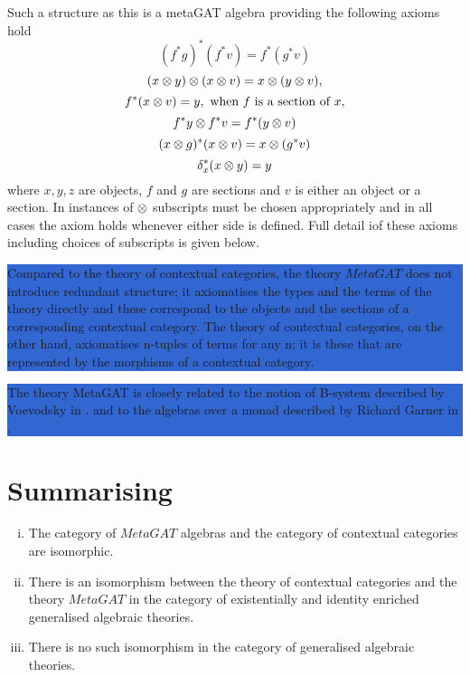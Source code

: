 \documentclass[10pt,a4paper]{article}
\newcommand{\highlightpara}[1]{\colorbox{highlight}{%
    \parbox{\dimexpr\linewidth-2\fboxsep}%
        {#1}}
}
\begin{document}
Such a structure as this is a metaGAT algebra providing the following axioms hold  
\begin{equation}
(f^*g)^*(f^*v) = f^*(g^*v)
\end{equation}
\begin{equation}
(x \otimes y) \otimes (x \otimes v) = x \otimes (y \otimes v), 
\end{equation}
\begin{equation}
f^*(x \otimes v) = y, \mbox{ when $f$ is a section of $x$,} 
\end{equation}
\begin{equation}
f^*y \otimes f^*v = f^*(y \otimes v)
\end{equation}
\begin{equation}
(x \otimes g)^*(x \otimes v)=x \otimes(g^*v)
\end{equation}
\begin{equation}
\delta_x ^*(x \otimes y)=y
\end{equation}
where $x, y, z$ are objects, $f$ and $g$ are sections and $v$ is either an object or a section. In instances of $\otimes$ subscripts must be chosen appropriately
and in all cases the axiom holds whenever either side is defined. Full detail iof these axioms including choices of subscripts is given below.

\iffalse
We can visualise the first of these axioms like this: 

\fi

\noindent
\highlightpara{
Compared to the theory of contextual categories, the theory $MetaGAT$ does not introduce redundant structure; it axiomatises the types and the terms of the theory directly and these correspond to the objects and the sections of a corresponding contextual category. The theory of contextual categories, on the other hand, axiomatises n-tuples of terms for any n; it is  these that are represented by the morphisms of a contextual category.}  

\noindent
\highlightpara{
The theory MetaGAT is closely related to the notion of B-system described by Voevodsky in
\cite{Voevodsky14B}.
and to the algebras over a monad described by Richard Garner in \cite{Garner15}.  
}
\section{Summarising}

\begin{enumerate}[(i)]
\item The category of $MetaGAT$ algebras and the category of contextual categories are isomorphic. 
\item There is an isomorphism between the theory of contextual categories and the theory $MetaGAT$ in the category of existentially and identity enriched generalised algebraic theories. 
\item There is no such isomorphism in the category of generalised algebraic theories.
\end{enumerate}
\end{document}
